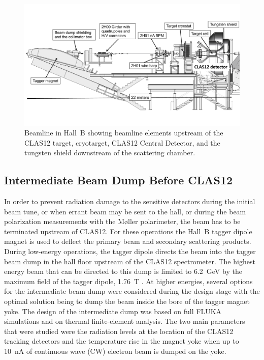 \begin{figure}[t]
\begin{center}
\includegraphics[width=1.\textwidth]{beamline_hall_1.pdf}
\caption{Beamline in Hall~B showing beamline elements upstream of the CLAS12 target, cryotarget, CLAS12
  Central Detector, and the tungsten shield downstream of the scattering chamber.}
\label{fig:hall1}
\end{center}
\end{figure}

\subsection{Intermediate Beam Dump Before CLAS12}
\label{sec-IBD}

In order to prevent radiation damage to the sensitive detectors during the initial beam tune, or when errant beam
may be sent to the hall, or during the beam polarization measurements with the M{\o}ller polarimeter, the beam
has to be terminated upstream of CLAS12. For these operations the Hall~B tagger dipole magnet is used to deflect
the primary beam and secondary scattering products. During low-energy operations, the tagger dipole directs the
beam into the tagger beam dump in the hall floor upstream of the CLAS12 spectrometer. The highest energy beam
that can be directed to this dump is limited to 6.2~GeV by the maximum field of the tagger dipole, 1.76~T
\cite{tagger}. At higher energies, several options for the intermediate beam dump were considered during the
design stage with the optimal solution being to dump the beam inside the bore of the tagger magnet yoke. The
design of the intermediate dump was based on full FLUKA~\cite{fluka} simulations and on thermal finite-element
analysis. The two main parameters that were studied were the radiation levels at the location of the CLAS12
tracking detectors and the temperature rise in the magnet yoke when up to 10~nA of continuous wave (CW) electron
beam is dumped on the yoke.  

